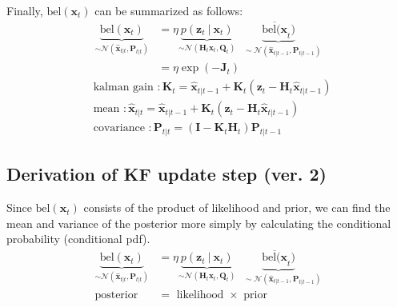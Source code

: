 \documentclass[10pt]{article}
\begin{document}
Finally, ${\text{bel}}(\mathbf{x}_{t})$ can be summarized as follows:
\begin{equation}
	\begin{aligned} 
		\underbrace{{\text{bel}}(\mathbf{x}_{t})}_{\sim \mathcal{N}(\hat{\mathbf{x}}_{t|t}, \mathbf{P}_{t|t})  }  & = \eta \underbrace{p(\mathbf{z}_{t} \ | \ \mathbf{x}_{t})}_{\sim \mathcal{N}(\mathbf{H}_t\mathbf{x}_{t}, \mathbf{Q}_{t})}  \underbrace{\overline{\text{bel}(\mathbf{x}}_{t})}_{\quad \sim \mathcal{N}(\hat{\mathbf{x}}_{t|t-1}, \mathbf{P}_{t|t-1})}    \\
		& = \eta \exp(-\mathbf{J}_{t})
	\end{aligned} 
\end{equation}
\begin{equation}
	\boxed{ \begin{aligned}
			& \text{kalman gain }: \mathbf{K}_t = \hat{\mathbf{x}}_{t|t-1} + \mathbf{K}_{t}( \mathbf{z}_{t} - \mathbf{H}_{t}\hat{\mathbf{x}}_{t|t-1}) \\
			& \text{mean }: \hat{\mathbf{x}}_{t|t} = \hat{\mathbf{x}}_{t|t-1} + \mathbf{K}_t(\mathbf{z}_t -   \mathbf{H}_t \hat{\mathbf{x}}_{t|t-1}) \\
			& \text{covariance }: \mathbf{P}_{t|t} = (\mathbf{I} - \mathbf{K}_{t}\mathbf{H}_{t})\mathbf{P}_{t|t-1}
	\end{aligned} }
\end{equation}

\subsection{Derivation of KF update step (ver. 2)}
Since ${\text{bel}}(\mathbf{x}_{t})$ consists of the product of likelihood and prior, we can find the mean and variance of the posterior more simply by calculating the conditional probability (conditional pdf).
\begin{equation}  
	\begin{aligned} 
		\underbrace{{\text{bel}}(\mathbf{x}_{t})}_{\sim \mathcal{N}(\hat{\mathbf{x}}_{t|t}, \mathbf{P}_{t|t})  }  & = \eta \underbrace{p(\mathbf{z}_{t} \ | \ \mathbf{x}_{t})}_{\sim \mathcal{N}(\mathbf{H}_t\mathbf{x}_{t}, \mathbf{Q}_{t})}  \underbrace{\overline{\text{bel}(\mathbf{x}}_{t})}_{\quad \sim \mathcal{N}(\hat{\mathbf{x}}_{t|t-1}, \mathbf{P}_{t|t-1})}   \\
		\text{posterior} & = \text{ likelihood } \times \text{ prior }
	\end{aligned} 
\end{equation}
\end{document}
